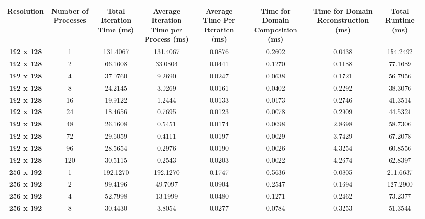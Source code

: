 \documentclass[11pt, a4paper]{article}
\begin{document}
		\newpage
		\begin{table}
		  \centering
		    \begin{tabular}{|c|c|c|c|c|c|c|c|}
				\hline
				\multicolumn{1}{|p{7.5em}|}{\textbf{Resolution}} & \multicolumn{1}{p{7.5em}|}{\textbf{Number of Processes}} & \multicolumn{1}{p{7.5em}|}{\textbf{Total Iteration Time (ms)}} & \multicolumn{1}{p{7.5em}|}{\textbf{Average Iteration Time per Process (ms)}} & \multicolumn{1}{p{7.5em}|}{\textbf{Average Time Per Iteration (ms)}} & \multicolumn{1}{p{7.5em}|}{\textbf{Time for Domain Composition (ms)}} & \multicolumn{1}{p{7.5em}|}{\textbf{Time for Domain Reconstruction (ms)}} & \multicolumn{1}{p{7.5em}|}{\textbf{Total Runtime (ms)}} \\
				\hline
				\textbf{192 x 128} & 1     & 131.4067 & 131.4067 & 0.0876 & 0.2602 & 0.0438 & 154.2492 \\
				\textbf{192 x 128} & 2     & 66.1608 & 33.0804 & 0.0441 & 0.1270 & 0.1188 & 77.1689 \\
				\textbf{192 x 128} & 4     & 37.0760 & 9.2690 & 0.0247 & 0.0638 & 0.1721 & 56.7956 \\
				\textbf{192 x 128} & 8     & 24.2145 & 3.0269 & 0.0161 & 0.0402 & 0.2292 & 38.3076 \\
				\textbf{192 x 128} & 16    & 19.9122 & 1.2444 & 0.0133 & 0.0173 & 0.2746 & 41.3514 \\
				\textbf{192 x 128} & 24    & 18.4656 & 0.7695 & 0.0123 & 0.0078 & 0.2909 & 44.5324 \\
				\textbf{192 x 128} & 48    & 26.1608 & 0.5451 & 0.0174 & 0.0098 & 2.8698 & 58.7306 \\
				\textbf{192 x 128} & 72    & 29.6059 & 0.4111 & 0.0197 & 0.0029 & 3.7429 & 67.2078 \\
				\textbf{192 x 128} & 96    & 28.5654 & 0.2976 & 0.0190 & 0.0026 & 4.3254 & 60.8556 \\
				\textbf{192 x 128} & 120   & 30.5115 & 0.2543 & 0.0203 & 0.0022 & 4.2674 & 62.8397 \\
				\hline
				\textbf{256 x 192} & 1     & 192.1270 & 192.1270 & 0.1747 & 0.5636 & 0.0805 & 211.6637 \\
				\textbf{256 x 192} & 2     & 99.4196 & 49.7097 & 0.0904 & 0.2547 & 0.1694 & 127.2900 \\
				\textbf{256 x 192} & 4     & 52.7998 & 13.1999 & 0.0480 & 0.1271 & 0.2462 & 73.2377 \\
				\textbf{256 x 192} & 8     & 30.4430 & 3.8054 & 0.0277 & 0.0784 & 0.3253 & 51.3544 \\

\end{tabular}
\end{table}
\end{document}

